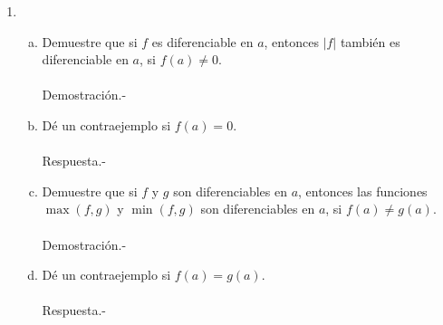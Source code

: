 \begin{enumerate}[\bfseries 1.]
     \item
	 \begin{enumerate}[(a)]

	     \item Demuestre que si $f$ es diferenciable en $a$, entonces $|f|$ también es diferenciable en $a$, si $f(a)\neq 0.$\\\\
		 Demostración.-\; 

	     \item Dé un contraejemplo si $f(a)=0$.\\\\
		 Respuesta.-\; 

	     \item Demuestre que si $f$ y $g$ son diferenciables en $a$, entonces las funciones $\max(f,g)$ y $\min(f,g)$ son diferenciables en $a$, si $f(a)\neq g(a)$.\\\\
		 Demostración.-\;

	     \item Dé un contraejemplo si $f(a)=g(a)$.\\\\
		 Respuesta.-\;

	 \end{enumerate}


\end{enumerate}
